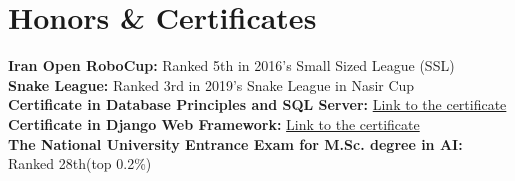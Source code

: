 
\section{Honors \& Certificates}
  \vspace{2pt}
  \resumeSubHeadingListStart
    \small{\item{
      \textbf{Iran Open RoboCup:} { Ranked 5th in 2016's Small Sized League (SSL)}
      \\ \vspace{3pt}
      \textbf{Snake League:} { Ranked 3rd in 2019's Snake League in Nasir Cup}
      \\ \vspace{3pt}
      \textbf{Certificate in Database Principles and SQL Server:} \href{https://maktabkhooneh.org/certificates/MK-O1USZA/?print=True}{\color{blue} Link to the certificate}
      \\ \vspace{3pt}
      \textbf{Certificate in Django Web Framework:} \href{https://www.coursera.org/account/accomplishments/verify/ZZDP44XE9B4G}{\color{blue} Link to the certificate}
      \\ \vspace{3pt}
      \textbf{The National University Entrance Exam for M.Sc. degree in AI:} { Ranked 28th(top 0.2\%)}
    }}
  \resumeSubHeadingListEnd